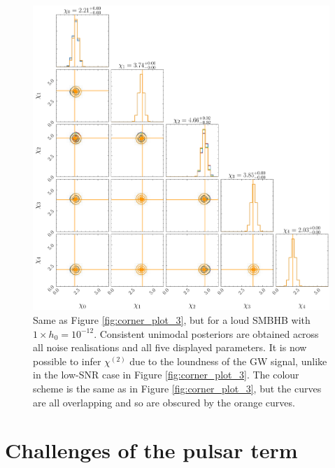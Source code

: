 \documentclass[fleqn,usenatbib,useAMS]{mnras}
\begin{document}
\begin{figure}
	\includegraphics[width=\columnwidth, height = \columnwidth ]{images/corner_highSNR_chi} 	
	\caption{Same as Figure \ref{fig:corner_plot_3}, but for a loud SMBHB with $1 \times h_0 = 10^{-12}$.  Consistent unimodal posteriors are obtained across all noise realisations and all five displayed parameters. It is now possible to infer $\chi^{(2)}$ due to the loundness of the GW signal, unlike in the low-SNR case in Figure \ref{fig:corner_plot_3}. The colour scheme is the same as in Figure \ref{fig:corner_plot_3}, but the curves are all overlapping and so are obscured by the orange curves.}
	\label{fig:corner_high_snr_appendix_chi}
\end{figure}


\section{Challenges of the pulsar term}\label{sec:psr_term_challenges}
\end{document}
